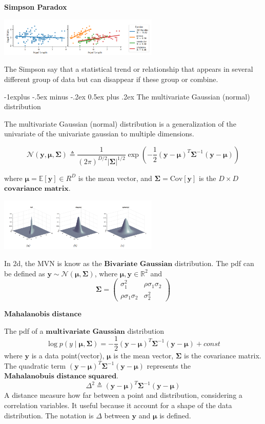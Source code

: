 \documentclass[10pt,landscape]{article}
\makeatletter
\newcommand{\cov}{\textrm{Cov}}
\newcommand{\N}{\mathcal{N}}
\newcommand{\mean}{\mathbb{E}}
\newcommand{\out}{\textbf{y}}
\newcommand{\R}{\mathbb{R}}
\newcommand{\Cov}{\mathbf{\Sigma}}
\newcommand{\Mean}{\boldsymbol{\mu}}
\renewcommand{\subsection}{\@startsection{subsection}{2}{0mm}%
                                {-1explus -.5ex minus -.2ex}%
                                {0.5ex plus .2ex}%
                                {\normalfont\normalsize\bfseries}}
\makeatother
\begin{document}
\begin{multicols*}{3}
\textbf{Simpson Paradox}

\begin{minipage}{\linewidth}
    \centering
    \includegraphics[width=3in]{figures/SimpsonParadox.PNG}
\end{minipage}
The Simpson say that a statistical trend or relationship that appears in several different group of data but can disappear if these group or combine. 

\subsection{The multivariate Gaussian (normal) distribution}

The multivariate Gaussian (normal) distribution is a generalization of the univariate of the univariate gaussian to multiple dimensions.

\[
    \N(\out,\Mean,\Cov) \triangleq \frac{1}{(2\pi)^{D/2}|\Cov|^{1/2}}\exp\left(-\frac{1}{2}(\out-\Mean)^T\Cov^{-1}(\out-\Mean)\right)
\]

where $\Mean = \mean[\out] \in R^D$ is the mean vector, and $\Cov=\cov[\out]$ is the $D\times D$ $\textbf{covariance matrix}$.

\begin{minipage}{\linewidth}
    \centering
    \includegraphics[width=3in]{figures/MVN.PNG}
\end{minipage}
In 2d, the MVN is know as the $\textbf{Bivariate Gaussian}$ distribution. The pdf can be defined as $\out\sim\N(\Mean,\Cov)$, where $\Mean,\out\in\R^2$ and 
\[
    \Cov=
    \begin{pmatrix}
        \sigma_1^2  & \rho\sigma_1\sigma_2  \\
        \rho\sigma_1\sigma_2 & \sigma_2^2
    \end{pmatrix}
\]

$\textbf{Mahalanobis distance}$

The pdf of a $\textbf{multivariate Gaussian}$ distribution
\[
    \log p(y\mid\Mean,\Cov)=-\frac{1}{2}(\out-\Mean)^T\Cov^{-1}(\out-\Mean) + const
\]
where $\out$ is a data point(vector), $\Mean$ is the mean vector, $\Cov$ is the covariance matrix. The quadratic term $(\out-\Mean)^T\Cov^{-1}(\out-\Mean)$ represents the $\textbf{Mahalanobuis distance squared}$.
\[
    \Delta^2 \triangleq (\out-\Mean)^T\Cov^{-1}(\out-\Mean)
\]
A distance measure how far between a point and distribution, considering a correlation variables. It useful because it account for a shape of the data distribution. The notation is $\Delta$ between $\out$ and $\Mean$ is defined.


\end{multicols*}
\end{document}
